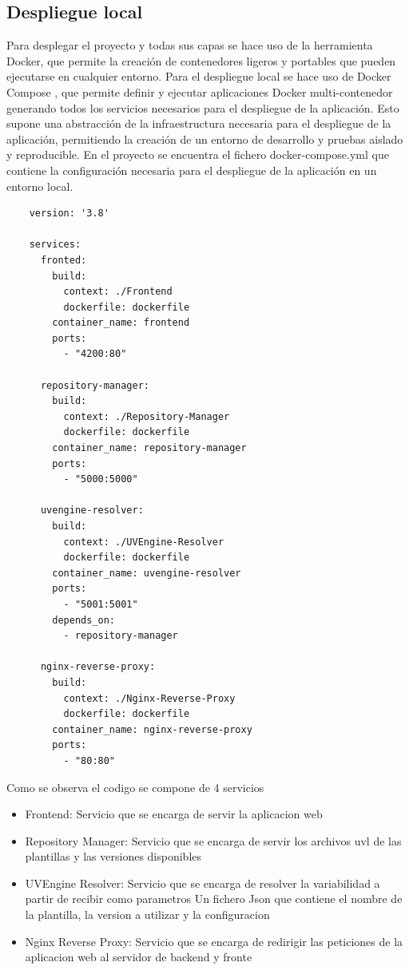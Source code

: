\documentclass[12pt, a4paper, twoside]{article}
\begin{document}
\subsection{ Despliegue local }
Para desplegar el proyecto y todas sus capas se hace uso de la herramienta Docker, que permite la creación de contenedores ligeros y portables que pueden ejecutarse en cualquier entorno.
Para el despliegue local se hace uso de Docker Compose \cite{docker_desktop}, que permite definir y ejecutar aplicaciones Docker multi-contenedor generando todos los servicios necesarios para el despliegue de la aplicación.
Esto supone una abstracción de la infraestructura necesaria para el despliegue de la aplicación, permitiendo la creación de un entorno de desarrollo y pruebas aislado y reproducible.
En el proyecto se encuentra el fichero docker-compose.yml que contiene la configuración necesaria para el despliegue de la aplicación en un entorno local.
\begin{verbatim}
	version: '3.8'

	services:
	  fronted:
		build:
		  context: ./Frontend
		  dockerfile: dockerfile
		container_name: frontend
		ports:
		  - "4200:80"
	  
	  repository-manager:
		build:
		  context: ./Repository-Manager
		  dockerfile: dockerfile
		container_name: repository-manager
		ports:
		  - "5000:5000"
	
	  uvengine-resolver:
		build:
		  context: ./UVEngine-Resolver
		  dockerfile: dockerfile
		container_name: uvengine-resolver
		ports:
		  - "5001:5001"
		depends_on:
		  - repository-manager
	  
	  nginx-reverse-proxy:
		build:
		  context: ./Nginx-Reverse-Proxy
		  dockerfile: dockerfile
		container_name: nginx-reverse-proxy
		ports:
		  - "80:80"
	\end{verbatim}

Como se observa el codigo se compone de 4 servicios 
\begin{itemize}
	\item Frontend: Servicio que se encarga de servir la aplicacion web
	\item Repository Manager: Servicio que se encarga de servir los archivos uvl de las plantillas y las versiones disponibles
	\item UVEngine Resolver: Servicio que se encarga de resolver la variabilidad a partir de recibir como parametros Un fichero Json que contiene el nombre de la plantilla, la version a utilizar y la configuracion 
	\item Nginx Reverse Proxy: Servicio que se encarga de redirigir las peticiones de la aplicacion web al servidor de backend y fronte	
\end{itemize}
\end{document}
